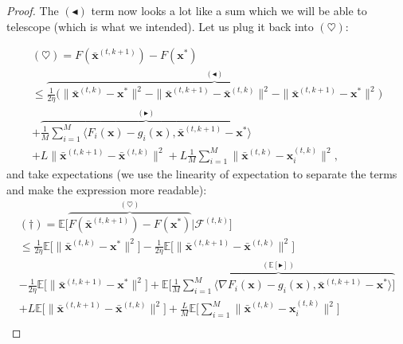 \begin{proof}
The $(\blacktriangleleft)$ term now looks a lot like a sum which we will be able to telescope (which is what we intended). Let us plug it back into $(\heartsuit)$:

\begin{align*}
    (\heartsuit)  = F(\bar{\bm{x}}^{(t,k+1)}) - F(\bm{x}^*) \\ \leq \overbrace{ \frac{1}{2\eta} \Big(\|  \bar{\bm{x}}^{(t,k)} - \bm{x}^{*} \|^2 - \|  \bar{\bm{x}}^{(t,k+1)} - \bar{\bm{x}}^{(t,k)} \|^2 - \| \bar{\bm{x}}^{(t,k+1)} - \bm{x}^{*} \|^2 \Big)}^{(\blacktriangleleft)} \\
    + \overbrace{\frac{1}{M} \sum_{i=1}^M  \langle F_i(\bm{x}) - g_i(\bm{x})  ,\bar{\bm{x}}^{(t,k+1)} - \bm{x}^{*} \rangle  }^{(\blacktriangleright)}
    \\+ L  \|\bar{\bm{x}}^{(t,k+1)}-\bar{\bm{x}}^{(t,k)} \|^2  +L \frac{1}{M} \sum_{i=1}^M \|\bar{\bm{x}}^{(t,k)}-\bm{x}_i^{(t,k)} \|^2,
\end{align*}
\noindent
and take expectations (we use the linearity of expectation to separate the terms and make the expression more readable):
\begin{align*}
    (\dagger) = \mathbb{E} \Big[ \overbrace{F(\bar{\bm{x}}^{(t,k+1)}) - F(\bm{x}^*)}^{(\heartsuit)} | \mathcal{F}^{(t,k)}\Big]\\
    \leq \frac{1}{2\eta} \mathbb{E} \Bigg[
    \|  \bar{\bm{x}}^{(t,k)} - \bm{x}^{*} \|^2 \Bigg]
    -  \frac{1}{2\eta} \mathbb{E} \Bigg[ \|  \bar{\bm{x}}^{(t,k+1)} - \bar{\bm{x}}^{(t,k)} \|^2 \Bigg] \\
    - \frac{1}{2\eta}  \mathbb{E} \Bigg[ \| \bar{\bm{x}}^{(t,k+1)} - \bm{x}^{*} \|^2  \Bigg] 
    +  \overbrace{\mathbb{E} \Bigg[ \frac{1}{M} \sum_{i=1}^M  \langle \nabla F_i(\bm{x}) - g_i(\bm{x})  ,\bar{\bm{x}}^{(t,k+1)} - \bm{x}^{*} \rangle    \Bigg] }^{(\mathbb{E}[\blacktriangleright])}
    \\+ L \mathbb{E} \Bigg[ \|\bar{\bm{x}}^{(t,k+1)}-\bar{\bm{x}}^{(t,k)} \|^2  \Bigg]  + \frac{L}{M}  \mathbb{E} \Bigg[ \sum_{i=1}^M \|\bar{\bm{x}}^{(t,k)}-\bm{x}_i^{(t,k)} \|^2 \Bigg] \\
\end{align*}


\end{proof}
